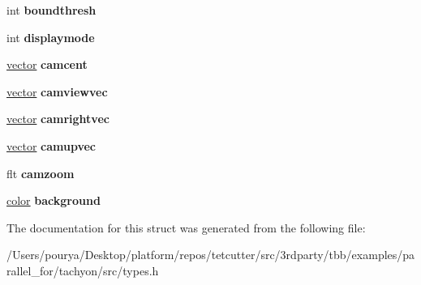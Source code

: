 \begin{DoxyCompactItemize}
\item 
\hypertarget{structscenedef_a5449eae42bc7d83ecfbc1bb0a6ed68f1}{}int {\bfseries boundthresh}\label{structscenedef_a5449eae42bc7d83ecfbc1bb0a6ed68f1}

\item 
\hypertarget{structscenedef_a4547cee2216faee1a34954b544533a05}{}int {\bfseries displaymode}\label{structscenedef_a4547cee2216faee1a34954b544533a05}

\item 
\hypertarget{structscenedef_a8e91179bfe6d03b9b4e7b10ce8002fd0}{}\hyperlink{structvector}{vector} {\bfseries camcent}\label{structscenedef_a8e91179bfe6d03b9b4e7b10ce8002fd0}

\item 
\hypertarget{structscenedef_acc9d8021df3de5308feb552c8eb9b4aa}{}\hyperlink{structvector}{vector} {\bfseries camviewvec}\label{structscenedef_acc9d8021df3de5308feb552c8eb9b4aa}

\item 
\hypertarget{structscenedef_a981a806b739e33f98a4efca2278cd301}{}\hyperlink{structvector}{vector} {\bfseries camrightvec}\label{structscenedef_a981a806b739e33f98a4efca2278cd301}

\item 
\hypertarget{structscenedef_a35f9b85f6a674ea786a41e61ba1c0ed7}{}\hyperlink{structvector}{vector} {\bfseries camupvec}\label{structscenedef_a35f9b85f6a674ea786a41e61ba1c0ed7}

\item 
\hypertarget{structscenedef_ab5215cf1a9eb81e2fce54e705dfcfd90}{}flt {\bfseries camzoom}\label{structscenedef_ab5215cf1a9eb81e2fce54e705dfcfd90}

\item 
\hypertarget{structscenedef_a81e42b1f188629660852f9615ee046ac}{}\hyperlink{structcolor}{color} {\bfseries background}\label{structscenedef_a81e42b1f188629660852f9615ee046ac}

\end{DoxyCompactItemize}


The documentation for this struct was generated from the following file\+:\begin{DoxyCompactItemize}
\item 
/\+Users/pourya/\+Desktop/platform/repos/tetcutter/src/3rdparty/tbb/examples/parallel\+\_\+for/tachyon/src/types.\+h\end{DoxyCompactItemize}
